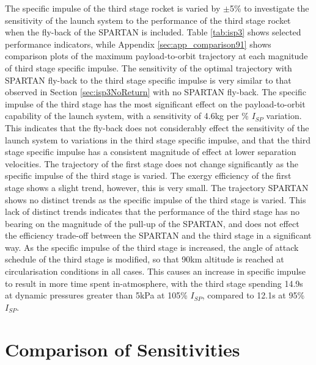 The specific impulse of the third stage rocket is varied by $\pm$5\% to investigate the sensitivity of the launch system to the performance of the third stage rocket when the fly-back of the SPARTAN is included. 
Table \ref{tab:isp3} shows selected performance indicators, while Appendix \ref{sec:app_comparison91} shows comparison plots of the maximum payload-to-orbit trajectory at each magnitude of third stage specific impulse. 
The sensitivity of the optimal trajectory with SPARTAN fly-back to the third stage specific impulse is very similar to that observed in Section \ref{sec:isp3NoReturn} with no SPARTAN fly-back.
The specific impulse of the third stage has the most significant effect on the payload-to-orbit capability of the launch system, with a sensitivity of 4.6kg per \% $I_{SP}$ variation. 
 This indicates that the fly-back does not considerably effect the sensitivity of the launch system to variations in the third stage specific impulse, and that the third stage specific impulse has a consistent magnitude of effect at lower separation velocities. 
The trajectory of the first stage does not change significantly as the specific impulse of the third stage is varied. 
The exergy efficiency of the first stage shows a slight trend, however, this is very small. 
The trajectory SPARTAN shows no distinct trends as the specific impulse of the third stage is varied. This lack of distinct trends indicates that the performance of the third stage has no bearing on the magnitude of the pull-up of the SPARTAN, and does not effect the efficiency trade-off between the SPARTAN and the third stage in a significant way. 
As the specific impulse of the third stage is increased, the angle of attack schedule of the third stage is modified, so that 90km altitude is reached at circularisation conditions in all cases. This causes an increase in specific impulse to result in more time spent in-atmosphere, with the third stage spending 14.9s at dynamic pressures greater than 5kPa at 105\% $I_{SP}$, compared to 12.1s at 95\% $I_{SP}$. 






\section{Comparison of Sensitivities}

